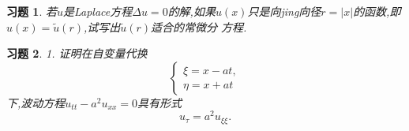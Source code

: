 \documentclass[a4paper,oneside,12pt]{ctexart}
\theoremstyle{plain}
\newtheorem{exercise}{习题}
\theoremstyle{nonumberplain}
\theoremstyle{nonumberplain}
\newcommand{\abs}[1]{\left\vert#1\right\vert}
\begin{document}
    \begin{exercise}
        \label{ex:1.4}
        若$u$是Laplace方程$\Delta u=0$的解,如果$u(x)$只是向jing向径$r=\abs{x}$的函数,即$u(x)=\tilde{u}(r)$,试写出$\tilde{u}(r)$适合的常微分
        方程.
    \end{exercise}

    \begin{exercise}
        \label{ex:1.5}
        1. 证明在自变量代换
        \begin{equation*}
            \begin{cases}
                \xi=x-at,\\
                \eta=x+at
            \end{cases}
        \end{equation*}
        下,波动方程$u_{tt}-a^2u_{xx}=0$具有形式
        \begin{equation*}
            u_\tau=a^2u_{\xi\xi}.
        \end{equation*}
    \end{exercise}
\end{document}
